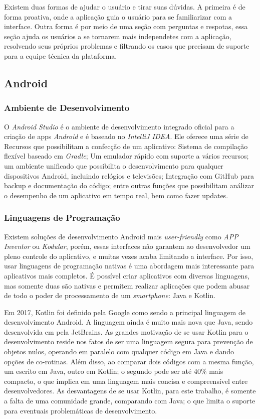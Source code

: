 Existem duas formas de ajudar o usuário e tirar suas dúvidas. A primeira é de forma proativa, onde a aplicação guia o usuário para se familiarizar com a interface. Outra forma é por meio de uma seção com perguntas e respotas, essa seção ajuda os usuários a se tornarem mais independetes com a aplicação, resolvendo seus próprios problemas e filtrando os casos que precisam de suporte para a equipe técnica da plataforma. \cite{site:nielsenHelpandDoc}

\subsection{Android}
\subsubsection{Ambiente de Desenvolvimento}

O \textit{Android Studio} é o ambiente de desenvolvimento integrado oficial para a criação de apps \textit{Android} e é baseado no \textit{IntelliJ IDEA}. Ele oferece uma série de Recursos que possibilitam a confecção de um aplicativo: Sistema de compilação flexível baseado em \textit{Gradle}; Um emulador rápido com suporte a vários recursos; um ambiente unificado que possibilita o desenvolvimento para qualquer dispositivos Android, incluindo relógios e televisões; Integração com GitHub para backup e documentação do código; entre outras funções que possibilitam análizar o desempenho de um aplicativo em tempo real, bem como fazer updates. \cite{site:androidstudio}

\subsubsection{Linguagens de Programação}

Existem soluções de desenvolvimento Android mais \textit{user-friendly} como \textit{APP Inventor} ou \textit{Kodular}, porém, essas interfaces não garantem ao desenvolvedor um pleno controle do aplicativo, e muitas vezes acaba limitando a interface. Por isso, usar linguagens de programação nativas é uma abordagem mais interessante para aplicativos mais completos. É possível criar aplicativos com diversas linguagens, mas somente duas são nativas e permitem realizar aplicações que podem abusar de todo o poder de processamento de um \textit{smartphone}: Java e Kotlin.

Em 2017, Kotlin foi definido pela Google como sendo a principal linguagem de desenvolvimento Android. A linguagem ainda é muito mais nova que Java, sendo desenvolvida em pela JetBrains. As grandes motivação de se usar Kotlin para o desenvolvimento reside nos fatos de ser uma linguagem segura para prevenção de objetos nulos, operando em paralelo com qualquer código em Java e dando opções de co-rotinas. Além disso, ao comparar dois códigos com a mesma função, um escrito em Java, outro em Kotlin; o segundo pode ser até 40\% mais compacto, o que implica em uma linguagem mais concisa e compreensível entre desenvolvedores. As desvantagens de se usar Kotlin, para este trabalho, é somente a falta de uma comunidade grande, comparando com Java; o que limita o suporte para eventuais problemáticas de desenvolvimento. \cite{site:kotlinxjava}

